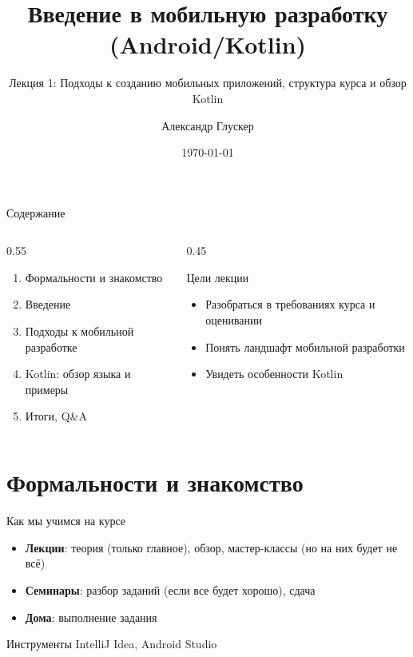\documentclass[aspectratio=169]{beamer}
\title{Введение в мобильную разработку (Android/Kotlin)}
\subtitle{Лекция 1: Подходы к созданию мобильных приложений, структура курса и обзор Kotlin}
\author{Александр Глускер}
\institute{Курс «Мобильная разработка»}
\date{\today}
\begin{document}
\begin{frame}
  \titlepage
\end{frame}

\begin{frame}{Содержание}
  \begin{columns}[T,onlytextwidth]
    \begin{column}{0.55\textwidth}
      \begin{enumerate}
        \item Формальности и знакомство 
        \item Введение 
        \item Подходы к мобильной разработке
        \item Kotlin: обзор языка и примеры
        \item Итоги, Q\&A
      \end{enumerate}
    \end{column}
    \begin{column}{0.45\textwidth}
      \begin{block}{Цели лекции}
        \begin{itemize}
          \item Разобраться в требованиях курса и оценивании
          \item Понять ландшафт мобильной разработки
          \item Увидеть особенности Kotlin
        \end{itemize}
      \end{block}
    \end{column}
  \end{columns}
\end{frame}

\section{Формальности и знакомство}

\begin{frame}{Как мы учимся на курсе}
  \begin{itemize}
    \item \textbf{Лекции}: теория (только главное), обзор, мастер-классы (но на них будет не всё)
    \item \textbf{Семинары}: разбор заданий (если все будет хорошо), сдача
    \item \textbf{Дома}: выполнение задания
  \end{itemize}
  \begin{block}{Инструменты}
    IntelliJ Idea, Android Studio
  \end{block}
\end{frame}
\end{document}
